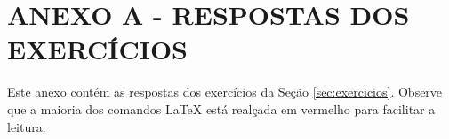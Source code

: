 \renewcommand{\thechapter}{}%
\chapter{ANEXO A - RESPOSTAS DOS EXERCÍCIOS} 
\label{anexoA} 
\renewcommand{\thechapter}{A}

Este anexo contém as respostas dos exercícios da Seção \ref{sec:exercicios}. Observe que a maioria dos comandos \LaTeX{} está realçada em vermelho para facilitar a leitura.

\tcbinputrecords
